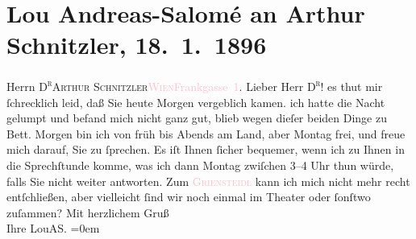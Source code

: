 

               \section[Lou Andreas-Salomé an Arthur Schnitzler, 18. 1. 1896]{ Lou Andreas-Salomé an Arthur Schnitzler, 18. 1. 1896}\nopagebreak{}\rehead{ }\normalsize\beginnumbering{} \toendnotes[C]{\smallbreak\pagebreak[2]} 
\pstart{}{\pb}Herrn \textsc{D\textsuperscript{r}}\pend{}\pstart{}\textsc{Arthur Schnitzler}\pend{}\pstart{}\textsc{\textcolor{pink}{Wien}{}\ledrightnote{\textcolor{pink}{Wien}}}\pend{}\pstart{}\textcolor{pink}{Frankgasse 1}{}\ledrightnote{\textcolor{pink}{Frankgasse}}.
                    \pend{}{\bigskip}\pstart
           \noindent{}{\pb}Lieber Herr \textsc{D\textsuperscript{r}}! es thut mir ſchrecklich leid, daß Sie heute Morgen
                    vergeblich kamen. ich hatte die Nacht gelumpt und befand mich nicht ganz gut,
                    blieb wegen dieſer beiden Dinge zu Bett. Morgen bin ich von früh bis Abends am
                    Land, aber Montag frei, und freue mich darauf, Sie zu ſprechen. Es iſt Ihnen
                    ſicher bequemer, wenn ich zu Ihnen in die Sprechſtunde komme, was ich dann
                    Montag zwiſchen 3–4 Uhr thun würde, falls Sie nicht weiter
                    antworten. Zum \textcolor{pink}{\textsc{Griensteidl}}{}\ledrightnote{\textcolor{pink}{Café Griensteidl}} kann ich mich nicht mehr recht entſchließen, aber vielleicht ſind
                    wir noch einmal im Theater oder ſonſtwo zuſammen?\pend
           \pstart
           Mit herzlichem Gruß{\\[\baselineskip]}Ihre \spacefill\mbox{LouAS.}\pend
           \leftskip=0em{}\endnumbering{}  
      
